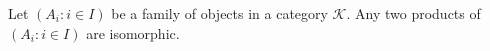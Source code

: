 Let $(A_i : i \in I)$ be a family of objects in a category $\mathcal{K}$. Any two products of $(A_i : i \in I)$ are isomorphic.
